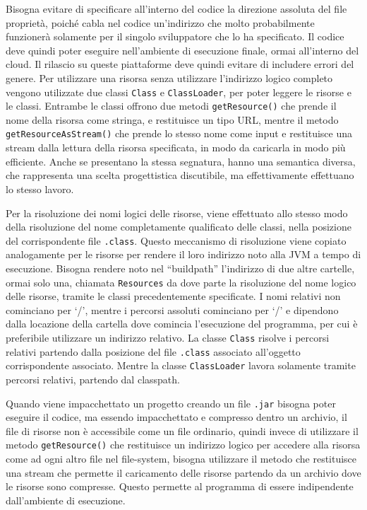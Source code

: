 \documentclass{article}
\numberwithin{equation}{subsection}
\begin{document}
Bisogna evitare di specificare all'interno del codice la direzione assoluta del file proprietà, poiché cabla nel codice un'indirizzo che molto probabilmente funzionerà 
solamente per il singolo sviluppatore che lo ha specificato. Il codice deve quindi poter eseguire nell'ambiente di esecuzione finale, ormai all'interno del cloud. Il rilascio 
su queste piattaforme deve quindi evitare di includere errori del genere. 
Per utilizzare una risorsa senza utilizzare l'indirizzo logico completo vengono utilizzate due classi \verb|Class| e \verb|ClassLoader|, per poter leggere le risorse e le classi. 
Entrambe le classi offrono due metodi \verb|getResource()| che prende il nome della risorsa come stringa, e restituisce un tipo URL, mentre il metodo \verb|getResourceAsStream()| che 
prende lo stesso nome come input e restituisce una stream dalla lettura della risorsa specificata, in modo da caricarla in modo più efficiente. Anche se presentano la 
stessa segnatura, hanno una semantica diversa, che rappresenta una scelta progettistica discutibile, ma effettivamente effettuano lo stesso lavoro. 

Per la risoluzione dei nomi logici delle risorse, viene effettuato allo stesso modo della risoluzione del nome completamente qualificato delle classi, nella posizione del 
corrispondente file \verb|.class|. 
Questo meccanismo di risoluzione viene copiato analogamente per le risorse per rendere il loro indirizzo noto alla JVM a tempo di esecuzione. 
Bisogna rendere noto nel ``buildpath'' l'indirizzo di due altre cartelle, ormai solo una, chiamata \verb|Resources| da dove parte la risoluzione del nome logico delle risorse, 
tramite le classi precedentemente specificate. I nomi relativi non cominciano per `/', mentre i percorsi assoluti cominciano per `/' e dipendono dalla locazione della cartella 
dove comincia l'esecuzione del programma, per cui è preferibile utilizzare un indirizzo relativo. 
La classe \verb|Class| risolve i percorsi relativi partendo dalla posizione del file \verb|.class| associato all'oggetto corrispondente associato. 
Mentre la classe \verb|ClassLoader| lavora solamente tramite percorsi relativi, partendo dal classpath. 

Quando viene impacchettato un progetto creando un file \verb|.jar| bisogna poter eseguire il codice, ma essendo impacchettato e compresso dentro un archivio, il file di 
risorse non è accessibile come un file ordinario, quindi invece di utilizzare il metodo \verb|getResource()| che restituisce un indirizzo logico per accedere alla risorsa come 
ad ogni altro file nel file-system, bisogna utilizzare il metodo che restituisce una stream che permette il caricamento delle risorse partendo da un archivio dove le risorse sono 
compresse. 
Questo permette al programma di essere indipendente dall'ambiente di esecuzione. 
\end{document}
